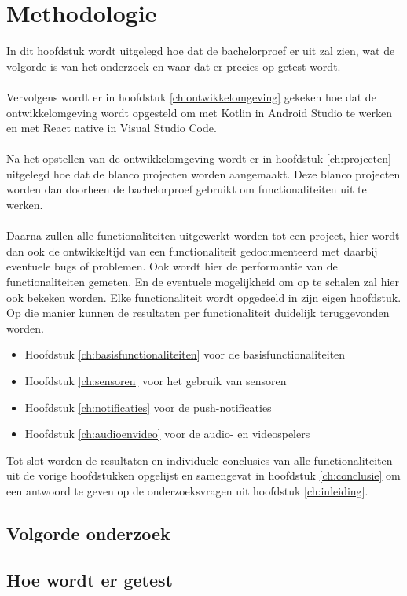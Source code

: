 
\chapter{Methodologie}
\label{ch:methodologie}

In dit hoofdstuk wordt uitgelegd hoe dat de bachelorproef er uit zal zien, wat 
de volgorde is van het onderzoek en waar dat er precies op getest wordt.
\\\\
Vervolgens wordt er in hoofdstuk \ref{ch:ontwikkelomgeving} gekeken hoe 
dat de ontwikkelomgeving wordt opgesteld om met Kotlin in Android Studio 
te werken en met React native in Visual Studio Code.
\\\\
Na het opstellen van de ontwikkelomgeving wordt er in hoofdstuk 
\ref{ch:projecten} uitgelegd hoe dat de blanco projecten worden aangemaakt. 
Deze blanco projecten worden dan doorheen de bachelorproef gebruikt om 
functionaliteiten uit te werken.
\\\\
Daarna zullen alle functionaliteiten uitgewerkt worden tot een project, 
hier wordt dan ook de ontwikkeltijd van een functionaliteit gedocumenteerd 
met daarbij eventuele bugs of problemen. Ook wordt hier de performantie van 
de functionaliteiten gemeten. En de eventuele mogelijkheid om op te 
schalen zal hier ook bekeken worden. Elke functionaliteit wordt opgedeeld 
in zijn eigen hoofdstuk. Op die manier kunnen de resultaten per 
functionaliteit duidelijk teruggevonden worden.
\begin{itemize}
    \item Hoofdstuk \ref{ch:basisfunctionaliteiten} voor de basisfunctionaliteiten
    \item Hoofdstuk \ref{ch:sensoren} voor het gebruik van sensoren
    \item Hoofdstuk \ref{ch:notificaties} voor de push-notificaties
    \item Hoofdstuk \ref{ch:audioenvideo} voor de audio- en videospelers
\end{itemize}
Tot slot worden de resultaten en individuele conclusies van alle 
functionaliteiten uit de vorige hoofdstukken opgelijst en samengevat in hoofdstuk 
\ref{ch:conclusie} om een antwoord te geven op de onderzoeksvragen uit 
hoofdstuk \ref{ch:inleiding}.

\section{Volgorde onderzoek}



\section{Hoe wordt er getest}





